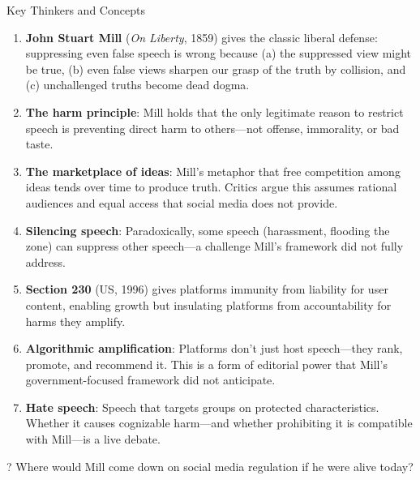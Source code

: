 ﻿\documentclass[aspectratio=169]{beamer}
\begin{document}
\begin{frame}[allowframebreaks]{Key Thinkers and Concepts}
\footnotesize
\begin{enumerate}
    \item \textbf{John Stuart Mill} (\textit{On Liberty}, 1859) gives the classic liberal defense: suppressing even false speech is wrong because (a) the suppressed view might be true, (b) even false views sharpen our grasp of the truth by collision, and (c) unchallenged truths become dead dogma.
    \item \textbf{The harm principle}: Mill holds that the only legitimate reason to restrict speech is preventing direct harm to others---not offense, immorality, or bad taste.
    \item \textbf{The marketplace of ideas}: Mill's metaphor that free competition among ideas tends over time to produce truth. Critics argue this assumes rational audiences and equal access that social media does not provide.
    \item \textbf{Silencing speech}: Paradoxically, some speech (harassment, flooding the zone) can suppress other speech---a challenge Mill's framework did not fully address.
    \item \textbf{Section 230} (US, 1996) gives platforms immunity from liability for user content, enabling growth but insulating platforms from accountability for harms they amplify.
    \item \textbf{Algorithmic amplification}: Platforms don't just host speech---they rank, promote, and recommend it. This is a form of editorial power that Mill's government-focused framework did not anticipate.
    \item \textbf{Hate speech}: Speech that targets groups on protected characteristics. Whether it causes cognizable harm---and whether prohibiting it is compatible with Mill---is a live debate.
\end{enumerate}

\begin{alertblock}{?}
Where would Mill come down on social media regulation if he were alive today?
\end{alertblock}
\end{frame}
\end{document}
